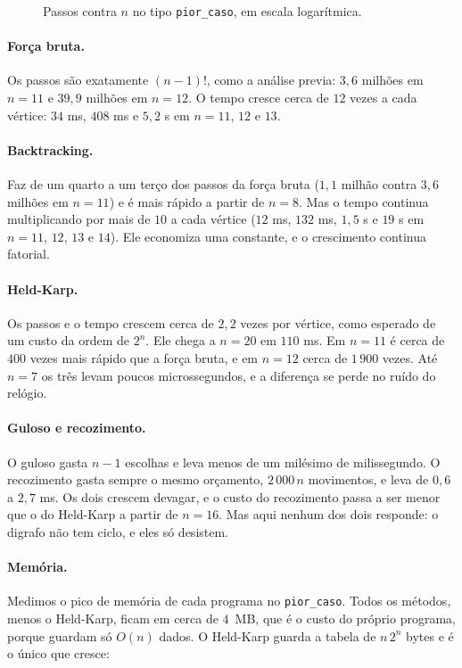 \documentclass[12pt,a4paper]{article}
\begin{document}
\begin{figure}[h]
\centering
\graficonos
\caption{Passos contra $n$ no tipo \texttt{pior\_caso}, em escala logarítmica.}
\label{fig:nos}
\end{figure}

\paragraph{Força bruta.} Os passos são exatamente $(n-1)!$, como a análise previa: $3{,}6$ milhões em $n=11$ e $39{,}9$ milhões em $n=12$. O tempo cresce cerca de $12$ vezes a cada vértice: $34$ ms, $408$ ms e $5{,}2$ s em $n=11$, $12$ e $13$.

\paragraph{Backtracking.} Faz de um quarto a um terço dos passos da força bruta ($1{,}1$ milhão contra $3{,}6$ milhões em $n=11$) e é mais rápido a partir de $n=8$. Mas o tempo continua multiplicando por mais de $10$ a cada vértice ($12$ ms, $132$ ms, $1{,}5$ s e $19$ s em $n=11$, $12$, $13$ e $14$). Ele economiza uma constante, e o crescimento continua fatorial.

\paragraph{Held-Karp.} Os passos e o tempo crescem cerca de $2{,}2$ vezes por vértice, como esperado de um custo da ordem de $2^n$. Ele chega a $n=20$ em $110$ ms. Em $n=11$ é cerca de $400$ vezes mais rápido que a força bruta, e em $n=12$ cerca de $1\,900$ vezes. Até $n=7$ os três levam poucos microssegundos, e a diferença se perde no ruído do relógio.

\paragraph{Guloso e recozimento.} O guloso gasta $n-1$ escolhas e leva menos de um milésimo de milissegundo. O recozimento gasta sempre o mesmo orçamento, $2\,000\,n$ movimentos, e leva de $0{,}6$ a $2{,}7$ ms. Os dois crescem devagar, e o custo do recozimento passa a ser menor que o do Held-Karp a partir de $n=16$. Mas aqui nenhum dos dois responde: o digrafo não tem ciclo, e eles só desistem.

\paragraph{Memória.} Medimos o pico de memória de cada programa no \texttt{pior\_caso}. Todos os métodos, menos o Held-Karp, ficam em cerca de $4$~MB, que é o custo do próprio programa, porque guardam só $O(n)$ dados. O Held-Karp guarda a tabela de $n\,2^n$ bytes e é o único que cresce:
\end{document}
